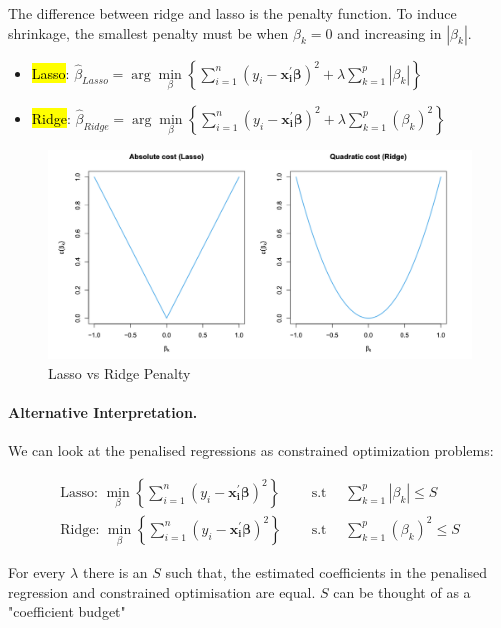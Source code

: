 \documentclass[11pt]{article}
\begin{document}
The difference between ridge and lasso is the penalty function. To induce shrinkage, the smallest penalty must be when $\beta_k = 0$ and increasing in $|\beta_k|$.

\begin{itemize}
    \item \hl{Lasso}: $\hat{\beta}_{Lasso} = \arg\underset{\beta}{\min}\left\{\sum_{i=1}^n(y_i - \mathbf{x_i^\prime}\bm{\beta})^2 + \lambda\sum_{k=1}^p |\beta_k|\right\}$
    \item \hl{Ridge}: $\hat{\beta}_{Ridge} = \arg\underset{\beta}{\min}\left\{\sum_{i=1}^n(y_i - \mathbf{x_i^\prime}\bm{\beta})^2 + \lambda\sum_{k=1}^p (\beta_k)^2\right\}$
\end{itemize}

\begin{figure}[h]
    \centering
    \includegraphics[width=.75\textwidth]{pic/penalty weights.png}
    \caption{Lasso vs Ridge Penalty}
    \label{fig:penalty weights}
\end{figure}

\paragraph{Alternative Interpretation.} We can look at the penalised regressions as constrained optimization problems:

\begin{align*}
    \text{Lasso: } \underset{\beta}{\min}\left\{\sum_{i=1}^n(y_i - \mathbf{x_i^\prime}\bm{\beta})^2\right\} &\quad  \text{ s.t } \quad \sum_{k=1}^p |\beta_k| \leq S \\
    \text{Ridge: } \underset{\beta}{\min}\left\{\sum_{i=1}^n(y_i - \mathbf{x_i^\prime}\bm{\beta})^2\right\} &\quad  \text{ s.t } \quad \sum_{k=1}^p (\beta_k)^2 \leq S 
\end{align*}

For every $\lambda$ there is an $S$ such that, the estimated coefficients in the penalised regression and constrained optimisation are equal. $S$ can be thought of as a "coefficient budget"
\end{document}
